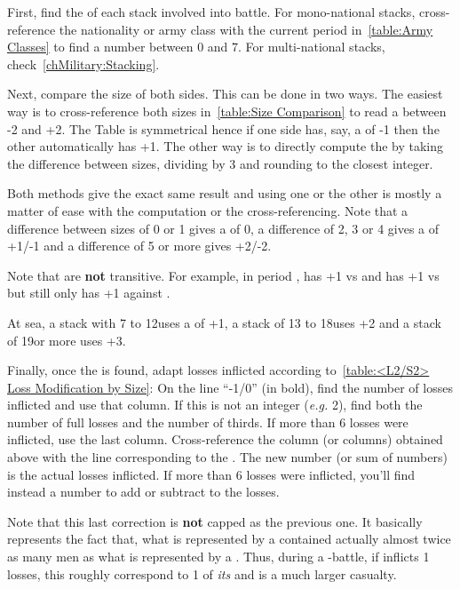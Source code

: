 First, find the  of each stack involved into battle. For
mono-national stacks, cross-reference the nationality or army class with the
current period in~\ref{table:Army Classes} to find a number between 0 and
7. For multi-national stacks, check~\ref{chMilitary:Stacking}.

Next, compare the size of both sides. This can be done in two ways. The
easiest way is to cross-reference both sizes in~\ref{table:Size Comparison} to
read a  between -2 and +2. The Table is symmetrical
hence if one side has, say, a  of -1 then the other
automatically has +1. The other way is to directly compute the  by taking the difference between sizes, dividing by 3 and
rounding to the closest integer.

Both methods give the exact same result and using one or the other is mostly a
matter of ease with the computation or the cross-referencing. Note that a
difference between sizes of 0 or 1 gives a  of 0, a
difference of 2, 3 or 4 gives a  of +1/-1 and a
difference of 5 or more gives +2/-2.

Note that  are \textbf{not} transitive. For example,
in period , \POL has +1 vs \FRA and \FRA has +1 vs \HIS but \POL
still only has +1 against \HIS.

At sea, a stack with 7 to 12\ND uses a  of +1, a
stack of 13 to 18\ND uses +2 and a stack of 19\ND or more uses +3.


\aparag Finally, once the  is found, adapt losses
inflicted according to~\ref{table:<L2/S2> Loss Modification by Size}:
\bparag On the line ``-1/0'' (in bold), find the number of losses inflicted
and use that column. If this is not an integer (\emph{e.g.} 2\td), find
both the number of full losses and the number of thirds. If more than 6 losses
were inflicted, use the last column.
\bparag Cross-reference the column (or columns) obtained above with the line
corresponding to the . The new number (or sum of
numbers) is the actual losses inflicted. If more than 6 losses were inflicted,
you'll find instead a number to add or subtract to the losses.

Note that this last correction is \textbf{not} capped as the previous one. It
basically represents the fact that, what is represented by a \TUR \LD
contained actually almost twice as many men as what is represented by a \HIS
\LD. Thus, during a \TUR-\HIS battle, if \TUR inflicts 1 losses, this roughly
correspond to 1 of \emph{its} \LD and is a much larger \HIS casualty.

